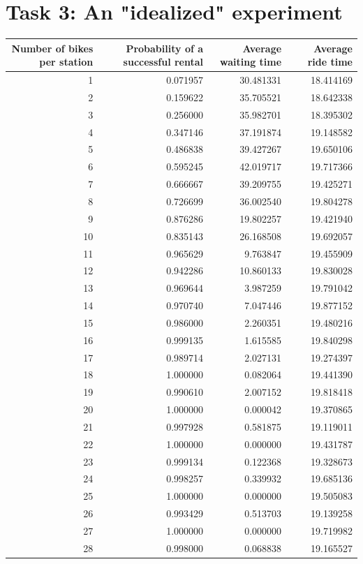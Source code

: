 \documentclass{article}
\begin{document}
\section{Task 3: An "idealized" experiment}
\begin{tabular}{rrrr}
\toprule
Number of bikes per station & Probability of a successful rental & Average waiting time & Average ride time \\
\midrule
1 & 0.071957 & 30.481331 & 18.414169 \\
2 & 0.159622 & 35.705521 & 18.642338 \\
3 & 0.256000 & 35.982701 & 18.395302 \\
4 & 0.347146 & 37.191874 & 19.148582 \\
5 & 0.486838 & 39.427267 & 19.650106 \\
6 & 0.595245 & 42.019717 & 19.717366 \\
7 & 0.666667 & 39.209755 & 19.425271 \\
8 & 0.726699 & 36.002540 & 19.804278 \\
9 & 0.876286 & 19.802257 & 19.421940 \\
10 & 0.835143 & 26.168508 & 19.692057 \\
11 & 0.965629 & 9.763847 & 19.455909 \\
12 & 0.942286 & 10.860133 & 19.830028 \\
13 & 0.969644 & 3.987259 & 19.791042 \\
14 & 0.970740 & 7.047446 & 19.877152 \\
15 & 0.986000 & 2.260351 & 19.480216 \\
16 & 0.999135 & 1.615585 & 19.840298 \\
17 & 0.989714 & 2.027131 & 19.274397 \\
18 & 1.000000 & 0.082064 & 19.441390 \\
19 & 0.990610 & 2.007152 & 19.818418 \\
20 & 1.000000 & 0.000042 & 19.370865 \\
21 & 0.997928 & 0.581875 & 19.119011 \\
22 & 1.000000 & 0.000000 & 19.431787 \\
23 & 0.999134 & 0.122368 & 19.328673 \\
24 & 0.998257 & 0.339932 & 19.685136 \\
25 & 1.000000 & 0.000000 & 19.505083 \\
26 & 0.993429 & 0.513703 & 19.139258 \\
27 & 1.000000 & 0.000000 & 19.719982 \\
28 & 0.998000 & 0.068838 & 19.165527 \\

\end{tabular}
\end{document}
